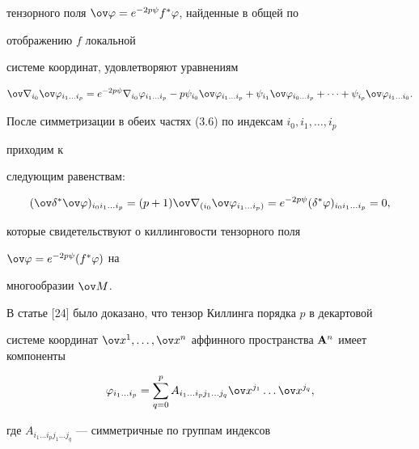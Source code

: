 тензорного поля $\ov\varphi=e^{-2p\psi}f^*\varphi$, найденные в общей по 


отображению $f$ локальной 


системе координат, удовлетворяют уравнениям 


\begin{equation} 


\ov\nabla_{i_0}\ov\varphi_{i_1\dotsc i_p}=e^{-2p\psi} 


\nabla_{i_0}\varphi_{i_1\dotsc i_p}-p\psi_{i_0} 


\ov\varphi_{i_1\dotsc i_p}+\psi_{i_1}\ov 


\varphi_{i_0\dotsc i_p}+\dotsb+\psi_{i_p} 


\ov\varphi_{i_1\dotsc i_0}. 


\end{equation} 


После симметризации в обеих частях (3.6) по индексам $i_0,i_1,\dotsc,i_p$ 


приходим к 


следующим равенствам: 


$$ 


(\ov\delta^*\ov\varphi)_{i_0i_1\dotsc i_p}=(p+1) 


\ov\nabla{}_{(i_0}\ov\varphi{}_{i_1\dotsc i_p)}=e^{-2p\psi} 


(\delta^*\varphi)_{i_0i_1\dotsc i_p}=0, 


$$ 


которые свидетельствуют о киллинговости тензорного поля 


$\ov\varphi=e^{-2p\psi}(f^*\varphi)$ на 


многообразии $\ov M$. 


 


В статье [24] было доказано, что тензор Киллинга порядка $p$ в декартовой 


системе координат $\ov x^1,\dotsc,\ov x^n$ аффинного пространства $\bold 


A^n$ имеет компоненты 


\begin{equation} 


\varphi_{i_1\dotsc i_p}=\sum^p_{q=0} 


A_{i_1\dotsc i_p j_1\dotsc j_q}\ov x^{j_1}\dotsc  


\ov x^{j_q}, 


\end{equation} 


где $A_{i_1\dotsc i_p j_1\dotsc j_q}$ --- симметричные по группам индексов 


